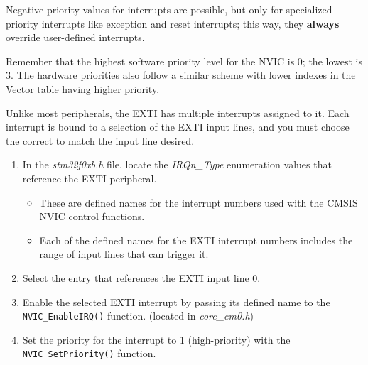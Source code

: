 \documentclass[openany,11pt,fleqn]{book} %
\begin{document}
Negative priority values for interrupts are possible, but only for specialized priority interrupts like exception and reset interrupts; this way, they \textbf{always} override user-defined interrupts.

\begin{warning}
    Remember that the highest software priority level for the NVIC is 0; the lowest is 3. The hardware priorities also follow a similar scheme with lower indexes in the Vector table having higher priority. 
\end{warning}

\begin{exercise}
    \label{ex4}
    Unlike most peripherals, the EXTI has multiple interrupts assigned to it. Each interrupt is bound to a selection of the EXTI input lines, and you must choose the correct to match the input line desired. 
    \begin{enumerate}
        \item In the \textit{stm32f0xb.h} file, locate the \textit{IRQn\_Type} enumeration values that reference the EXTI peripheral. 
        \begin{itemize}
            \item These are defined names for the interrupt numbers used with the CMSIS NVIC control functions.
            \item Each of the defined names for the EXTI interrupt numbers includes the range of input lines that can trigger it. 
        \end{itemize}
        \item Select the entry that references the EXTI input line 0.
        \item Enable the selected EXTI interrupt by passing its defined name to the  \texttt{NVIC\_EnableIRQ()} function. (located in \textit{core\_cm0.h})
        \item Set the priority for the interrupt to 1 (high-priority) with the \texttt{NVIC\_SetPriority()} function.
    \end{enumerate}
    
\end{exercise}


\end{document}
